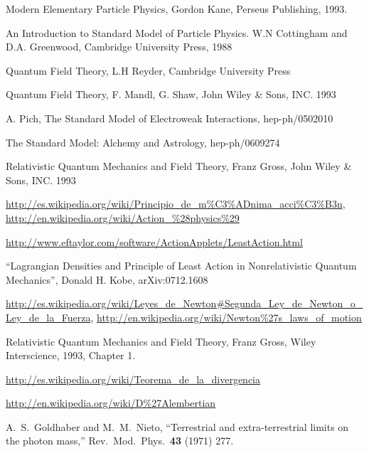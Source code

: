 
\begin{thebibliography}{999}
Modern Elementary Particle Physics, Gordon Kane, Perseus Publishing, 1993.

An Introduction to Standard Model of Particle Physics. W.N Cottingham and D.A. Greenwood, Cambridge University Press, 1988

Quantum Field Theory, L.H Reyder, Cambridge University Press

Quantum Field Theory, F. Mandl, G. Shaw, John Wiley \& Sons, INC. 1993

A. Pich, The Standard Model of Electroweak Interactions, hep-ph/0502010

The Standard Model: Alchemy and Astrology, hep-ph/0609274

Relativistic Quantum Mechanics and Field Theory, Franz Gross, John Wiley \& Sons, INC. 1993

\url{http://es.wikipedia.org/wiki/Principio_de_m\%C3\%ADnima_acci\%C3\%B3n}, 
\url{http://en.wikipedia.org/wiki/Action_\%28physics\%29}


\url{http://www.eftaylor.com/software/ActionApplets/LeastAction.html}

``Lagrangian Densities and Principle of Least Action in Nonrelativistic Quantum Mechanics'', Donald H. Kobe, arXiv:0712.1608

\url{http://es.wikipedia.org/wiki/Leyes_de_Newton#Segunda_Ley_de_Newton_o_Ley_de_la_Fuerza}, 
\href{http://en.wikipedia.org/wiki/Newton\%27s_laws_of_motion#Newton.27s_second_law:_law_of_acceleration}{http://en.wikipedia.org/wiki/Newton\%27s\_laws\_of\_motion}

Relativistic Quantum Mechanics and Field Theory, Franz Gross, Wiley Interscience, 1993, Chapter 1.

\url{http://es.wikipedia.org/wiki/Teorema_de_la_divergencia}

\url{http://en.wikipedia.org/wiki/D%27Alembertian}

  A.~S.~Goldhaber and M.~M.~Nieto,
  ``Terrestrial and extra-terrestrial limits on the photon mass,''
  Rev.\ Mod.\ Phys.\  {\bf 43} (1971) 277.


\end{thebibliography}
